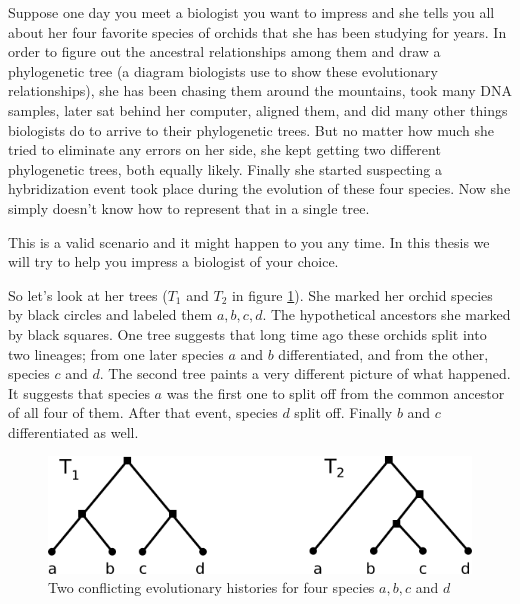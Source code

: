 Suppose one day you meet a biologist you want to impress and she tells you all about her four favorite species of orchids that she has been studying for years. In order to figure out the ancestral relationships among them and draw a phylogenetic tree (a diagram biologists use to show these evolutionary relationships), she has been chasing them around the mountains, took many DNA samples, later sat behind her computer, aligned them, and did many other things biologists do to arrive to their phylogenetic trees. But no matter how much she tried to eliminate any errors on her side, she kept getting two different phylogenetic trees, both equally likely. Finally she started suspecting a hybridization event took place during the evolution of these four species. Now she simply doesn't know how to represent that in a single tree. 

This is a valid scenario and it might happen to you any time. In this thesis we will try to help you impress a biologist of your choice. 

So let's look at her trees ($T_1$ and $T_2$ in figure \ref{fig:toyex}). She marked her orchid species by black circles and labeled them $a,b,c,d$. The hypothetical ancestors she marked by black squares. One tree suggests that long time ago these orchids split into two lineages; from one later species $a$ and $b$ differentiated, and from the other, species $c$ and $d$. The second tree paints a very different picture of what happened. It suggests that species $a$ was the first one to split off from the common ancestor of all four of them. After that event, species $d$ split off. Finally $b$ and $c$ differentiated as well. 

  \begin{figure}[h]
    \centering
    \includegraphics[scale=0.5]{../figs/ch1/toyex.png}
    \caption{Two conflicting evolutionary histories for four species $a,b,c$ and $d$}
    \label{fig:toyex}
  \end{figure}

